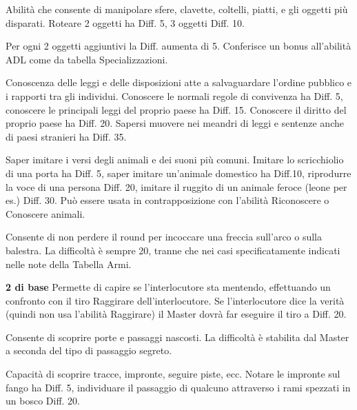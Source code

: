  Abilit\`a che consente di manipolare sfere,
clavette, coltelli, piatti, e gli oggetti pi\`u disparati. Roteare 2
oggetti ha Diff. 5, 3 oggetti Diff.  10. 

Per ogni 2 oggetti aggiuntivi la Diff. aumenta di 5. Conferisce un
bonus all'abilit\`a ADL come da tabella Specializzazioni.

 Conoscenza delle leggi e delle
disposizioni atte a salvaguardare l'ordine pubblico e i rapporti tra
gli individui. Conoscere le normali regole di convivenza ha Diff. 5,
conoscere le principali leggi del proprio paese ha Diff. 15. Conoscere
il diritto del proprio paese ha Diff. 20. Sapersi muovere nei meandri
di leggi e sentenze anche di paesi stranieri ha Diff. 35.

 Saper imitare i versi degli animali e dei suoni
pi\`u comuni.  Imitare lo scricchiolio di una porta ha Diff.  5, saper
imitare un'animale domestico ha Diff.10, riprodurre la voce di una
persona Diff. 20, imitare il ruggito di un animale feroce (leone per
es.) Diff. 30. Pu\`o essere usata in contrapposizione con l'abilit\`a
Riconoscere o Conoscere animali.

 Consente di non perdere il round per
incoccare una freccia sull'arco o sulla balestra. La difficolt\`a \`e
sempre 20, tranne che nei casi specificatamente indicati nelle note
della Tabella Armi.


 \textbf{2 di base} Permette di
capire se l'interlocutore sta mentendo, effettuando un confronto con il
tiro Raggirare dell'interlocutore. Se l'interlocutore dice la verit\`a
(quindi non usa l'abilit\`a Raggirare) il Master dovr\`a far eseguire
il tiro a Diff. 20.

 Consente di scoprire porte
e passaggi nascosti. La difficolt\`a \`e stabilita dal Master a
seconda del tipo di passaggio segreto.
\fi

 Capacit\`a di scoprire tracce,
impronte, seguire piste, ecc.  Notare le impronte sul fango ha Diff.
5, individuare il passaggio di qualcuno attraverso i rami spezzati in
un bosco Diff. 20.

